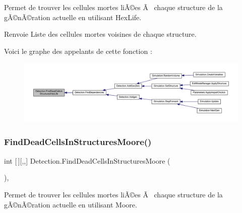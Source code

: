Permet de trouver les cellules mortes liÃ©es Ã  chaque structure de la gÃ©nÃ©ration actuelle en utilisant Hex\+Life. 

\begin{DoxyReturn}{Renvoie}
Liste des cellules mortes voisines de chaque structure.
\end{DoxyReturn}
Voici le graphe des appelants de cette fonction \+:
\nopagebreak
\begin{figure}[H]
\begin{center}
\leavevmode
\includegraphics[width=350pt]{class_detection_ac836468018dc40fd2261136a035eb25a_icgraph}
\end{center}
\end{figure}
\mbox{\label{class_detection_a018511f85c3fb9eca82fc06c9f4eb031}} 
\subsubsection{\texorpdfstring{Find\+Dead\+Cells\+In\+Structures\+Moore()}{FindDeadCellsInStructuresMoore()}}
{\footnotesize\ttfamily int \mbox{[}$\,$\mbox{]}\mbox{[},,\mbox{]} Detection.\+Find\+Dead\+Cells\+In\+Structures\+Moore (\begin{DoxyParamCaption}{ }\end{DoxyParamCaption})\hspace{0.3cm}{\ttfamily [inline]}, {\ttfamily [private]}}



Permet de trouver les cellules mortes liÃ©es Ã  chaque structure de la gÃ©nÃ©ration actuelle en utilisant Moore. 

